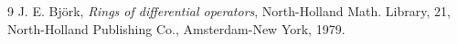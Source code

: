 \documentclass[12pt, a4paper]{amsart}
\begin{document}
\begin{thebibliography}{9}
{\sc J. E. Bj\"ork},
{\em Rings of differential operators},
North-Holland Math. Library, 21,
North-Holland Publishing Co., Amsterdam-New York, 1979.

\end{thebibliography}
\end{document}
